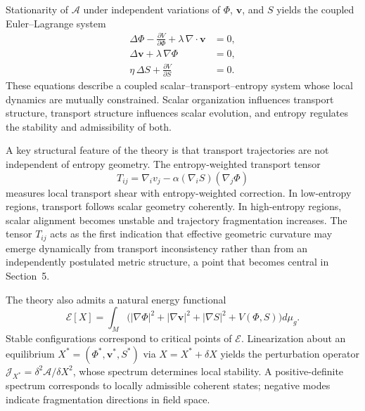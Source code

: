 \documentclass[12pt,a4paper]{article}
\begin{document}
Stationarity of $\mathcal{A}$ under independent variations of $\Phi$,
$\mathbf{v}$, and $S$ yields the coupled Euler--Lagrange system
\begin{align}
\Delta\Phi - \tfrac{\partial V}{\partial\Phi} + \lambda\,\nabla\cdot\mathbf{v}
  &= 0,\label{EL-phi}\\
\Delta\mathbf{v} + \lambda\,\nabla\Phi &= 0,\label{EL-v}\\
\eta\,\Delta S + \tfrac{\partial V}{\partial S} &= 0.\label{EL-S}
\end{align}
These equations describe a coupled scalar--transport--entropy system whose local
dynamics are mutually constrained. Scalar organization influences transport
structure, transport structure influences scalar evolution, and entropy regulates
the stability and admissibility of both.

A key structural feature of the theory is that transport trajectories are not
independent of entropy geometry. The entropy-weighted transport tensor
\[
T_{ij} = \nabla_i v_j - \alpha(\nabla_i S)(\nabla_j\Phi)
\]
measures local transport shear with entropy-weighted correction. In low-entropy
regions, transport follows scalar geometry coherently. In high-entropy regions,
scalar alignment becomes unstable and trajectory fragmentation increases. The
tensor $T_{ij}$ acts as the first indication that effective geometric curvature
may emerge dynamically from transport inconsistency rather than from an
independently postulated metric structure, a point that becomes central in
Section~5.

The theory also admits a natural energy functional
\[
\mathcal{E}[X]
= \int_M\!\bigl(|\nabla\Phi|^2+|\nabla\mathbf{v}|^2+|\nabla S|^2+V(\Phi,S)\bigr)d\mu_g.
\]
Stable configurations correspond to critical points of $\mathcal{E}$.
Linearization about an equilibrium $X^\ast=(\Phi^\ast,\mathbf{v}^\ast,S^\ast)$
via $X=X^\ast+\delta X$ yields the perturbation operator
$\mathcal{J}_{X^\ast}=\delta^2\mathcal{A}/\delta X^2$, whose spectrum
determines local stability. A positive-definite spectrum corresponds to locally
admissible coherent states; negative modes indicate fragmentation directions in
field space.
\end{document}
